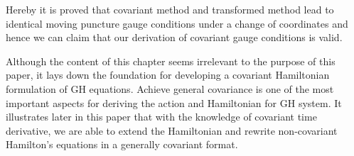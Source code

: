 Hereby it is proved that covariant method and transformed method lead to identical moving puncture gauge conditions under a change of coordinates and hence we can claim that our derivation of covariant gauge conditions is valid. 

Although the content of this chapter seems irrelevant to the purpose of this paper, it lays down the foundation for developing a covariant Hamiltonian formulation of GH equations. Achieve general covariance is one of the most important aspects for deriving the action and Hamiltonian for GH system. It illustrates later in this paper that with the knowledge of covariant time derivative, we are able to extend the Hamiltonian and rewrite non-covariant Hamilton's equations in a generally covariant format.  

